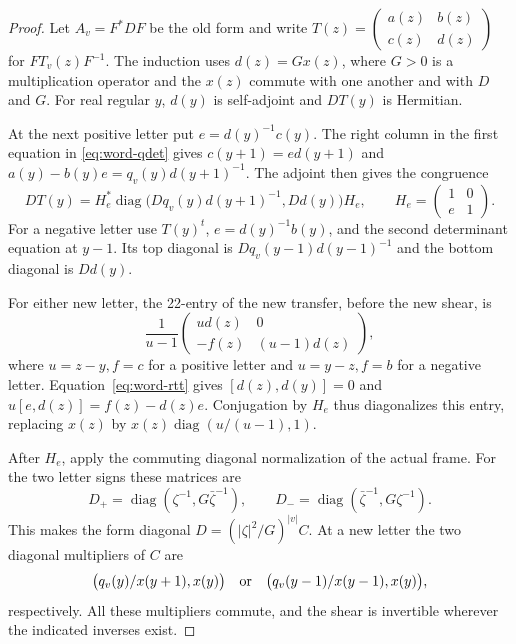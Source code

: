 \begin{proof}

Let \(A_v=F^*DF\) be the old form and write
\(T(z)=\left(\begin{smallmatrix}a(z)&b(z)\\c(z)&d(z)\end{smallmatrix}\right)\)
for \(F T_v(z)F^{-1}\). The induction uses \(d(z)=Gx(z)\),
where \(G>0\) is a multiplication operator and the \(x(z)\)
commute with one another and with \(D\) and \(G\). For real
regular \(y\), \(d(y)\) is self-adjoint and \(DT(y)\) is
Hermitian.

At the next positive letter put \(e=d(y)^{-1}c(y)\).
The right column in the first equation in \eqref{eq:word-qdet}
gives \(c(y+1)=e d(y+1)\) and
\(a(y)-b(y)e=q_v(y)d(y+1)^{-1}\).
The adjoint then gives the congruence
\[
 DT(y)=H_e^*
   \operatorname{diag}\big(Dq_v(y)d(y+1)^{-1},Dd(y)\big)H_e,
 \qquad H_e=\begin{pmatrix}1&0\\e&1\end{pmatrix}.
\]
For a negative letter use \(T(y)^t\), \(e=d(y)^{-1}b(y)\),
and the second determinant equation at \(y-1\). Its top
diagonal is \(Dq_v(y-1)d(y-1)^{-1}\) and the bottom
diagonal is \(Dd(y)\).

For either new letter, the 22-entry of the new transfer,
before the new shear, is
\[
 \frac{1}{u-1}
 \begin{pmatrix}u d(z)&0\\-f(z)&(u-1)d(z)\end{pmatrix},
\]
where \(u=z-y,f=c\) for a positive letter and \(u=y-z,f=b\)
for a negative letter. Equation~\eqref{eq:word-rtt} gives
\([d(z),d(y)]=0\) and \(u[e,d(z)]=f(z)-d(z)e\).
Conjugation by \(H_e\) thus diagonalizes this entry, replacing
\(x(z)\) by \(x(z)\operatorname{diag}(u/(u-1),1)\).

After \(H_e\), apply the commuting diagonal normalization of the actual frame. For the two letter signs these matrices are 
\[
 D_+=\operatorname{diag}(\zeta^{-1},G\bar\zeta^{-1}),\qquad D_-=\operatorname{diag}(\bar\zeta^{-1},G\zeta^{-1}).
\]
 This makes the form
diagonal \(D=(|\zeta|^2/G)^{|v|}C\).
At a new letter the two diagonal multipliers of \(C\) are
\[
  \big(q_v(y)/x(y+1),x(y)\big)
  \quad\hbox{or}\quad
  \big(q_v(y-1)/x(y-1),x(y)\big),
\]
respectively. All these multipliers commute, and the shear is
invertible wherever the indicated inverses exist.


\end{proof}
